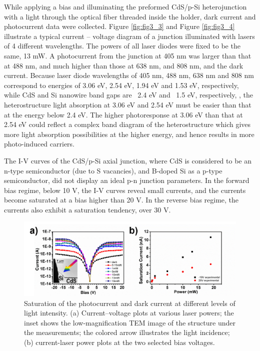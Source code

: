 While applying a bias and illuminating the preformed CdS/p-Si heterojunction with a light through the optical fiber threaded inside the holder, dark current and photocurrent data were collected. Figure \ref{fig:fig3_3} and Figure \ref{fig:fig3_4} illustrate a typical current – voltage diagram of a junction illuminated with lasers of 4 different wavelengths. The powers of all laser diodes were fixed to be the same, 13 mW. A photocurrent from the junction at 405 nm was larger than that at 488 nm, and much higher than those at 638 nm, and 808 nm, and the dark current. Because laser diode wavelengths of 405 nm, 488 nm, 638 nm and 808 nm correspond to energies of 3.06 eV, 2.54 eV, 1.94 eV and 1.53 eV, respectively, while CdS and Si nanowire band gaps are ~2.4 eV and ~1.5 eV, respectively, \cite{Fabbri2014}, the heterostructure light absorption at 3.06 eV and 2.54 eV must be easier than that at the energy below 2.4 eV. The higher photoresponse at 3.06 eV than that at 2.54 eV could reflect a complex band diagram of the heterostructure which gives more light absorption possibilities at the higher energy, and hence results in more photo-induced carriers. 


The I-V curves of the CdS/p-Si axial junction, where CdS is considered to be an n-type semiconductor (due to S vacancies), and B-doped Si as a p-type semiconductor, did not display an ideal p-n junction parameters. In the forward bias regime, below 10 V, the I-V curves reveal small currents, and the currents become saturated at a bias higher than 20 V. In the reverse bias regime, the currents also exhibit a saturation tendency, over 30 V. 

\begin{figure}  
\includegraphics[width=\textwidth]{figures/figure3_5}
\caption[Photocurrent at different power]{Saturation of the photocurrent and dark current at different levels of light intensity. (a) Current–voltage plots at various laser powers; the inset shows the low-magnification TEM image of the structure under the measurements; the colored arrow illustrates the light incidence; (b) current-laser power plots at the two selected bias voltages.
\label{fig:fig3_5}}
\end{figure}

